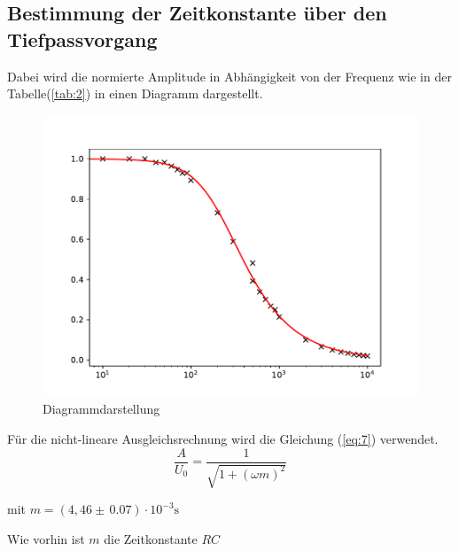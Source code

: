 \subsection{Bestimmung der Zeitkonstante über den Tiefpassvorgang}
Dabei wird die normierte Amplitude in Abhängigkeit von der Frequenz wie in der Tabelle(\ref{tab:2}) in
einen Diagramm dargestellt.

\begin{figure}[H]
  \centering
  \includegraphics[width=\textwidth]{Diagramm2.pdf}
  \caption{Diagrammdarstellung}
  \label{fig:7}
\end{figure}
Für die nicht-lineare Ausgleichsrechnung wird die Gleichung (\ref{eq:7}) verwendet.
\begin{equation*}
  \frac{A}{U_0} = \frac{1}{\sqrt{1 + (\omega m)^2}}
\end{equation*}
\centerline{mit $m = (4,46 \pm \, 0.07) \cdot 10^{-3} \si{\second}$}
Wie vorhin ist $m$ die Zeitkonstante $RC$

